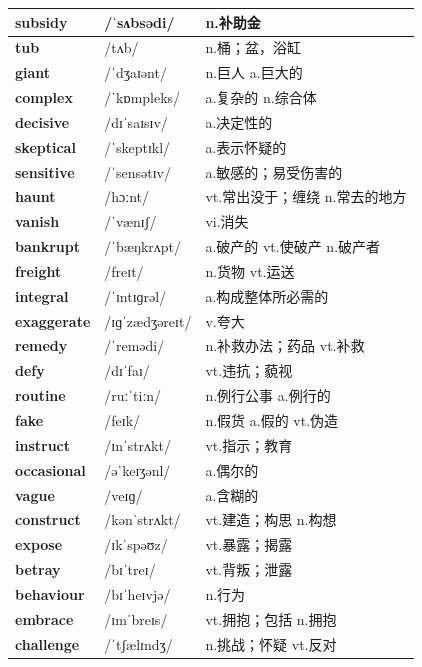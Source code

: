 \documentclass[14pt,a4paper]{extarticle}
\begin{document}
\begin{longtable}{ p{} p{} p{} }
\textbf{subsidy} & /ˈsʌbsədi/ & n.补助金 \\ \hline
\textbf{tub} & /tʌb/ & n.桶；盆，浴缸 \\ \hline
\textbf{giant} & /ˈdʒaɪənt/ & n.巨人 \quad a.巨大的 \\ \hline
\textbf{complex} & /ˈkɒmpleks/ & a.复杂的 \quad n.综合体 \\ \hline
\textbf{decisive} & /dɪˈsaɪsɪv/ & a.决定性的 \\ \hline
\textbf{skeptical} & /ˈskeptɪkl/ & a.表示怀疑的 \\ \hline
\textbf{sensitive} & /ˈsensətɪv/ & a.敏感的；易受伤害的 \\ \hline
\textbf{haunt} & /hɔːnt/ & vt.常出没于；缠绕 \quad n.常去的地方 \\ \hline
\textbf{vanish} & /ˈvænɪʃ/ & vi.消失 \\ \hline
\textbf{bankrupt} & /ˈbæŋkrʌpt/ & a.破产的 \quad vt.使破产 \quad n.破产者 \\ \hline
\textbf{freight} & /freɪt/ & n.货物 \quad vt.运送 \\ \hline
\textbf{integral} & /ˈɪntɪɡrəl/ & a.构成整体所必需的 \\ \hline
\textbf{exaggerate} & /ɪɡˈzædʒəreɪt/ & v.夸大 \\ \hline
\textbf{remedy} & /ˈremədi/ & n.补救办法；药品 \quad vt.补救 \\ \hline
\textbf{defy} & /dɪˈfaɪ/ & vt.违抗；藐视 \\ \hline
\textbf{routine} & /ruːˈtiːn/ & n.例行公事 \quad a.例行的 \\ \hline
\textbf{fake} & /feɪk/ & n.假货 \quad a.假的 \quad vt.伪造 \\ \hline
\textbf{instruct} & /ɪnˈstrʌkt/ & vt.指示；教育 \\ \hline
\textbf{occasional} & /əˈkeɪʒənl/ & a.偶尔的 \\ \hline
\textbf{vague} & /veɪɡ/ & a.含糊的 \\ \hline
\textbf{construct} & /kənˈstrʌkt/ & vt.建造；构思 \quad n.构想 \\ \hline
\textbf{expose} & /ɪkˈspəʊz/ & vt.暴露；揭露 \\ \hline
\textbf{betray} & /bɪˈtreɪ/ & vt.背叛；泄露 \\ \hline
\textbf{behaviour} & /bɪˈheɪvjə/ & n.行为 \\ \hline
\textbf{embrace} & /ɪmˈbreɪs/ & vt.拥抱；包括 \quad n.拥抱 \\ \hline
\textbf{challenge} & /ˈtʃælɪndʒ/ & n.挑战；怀疑 \quad vt.反对 \\ \hline

\end{longtable}
\end{document}
